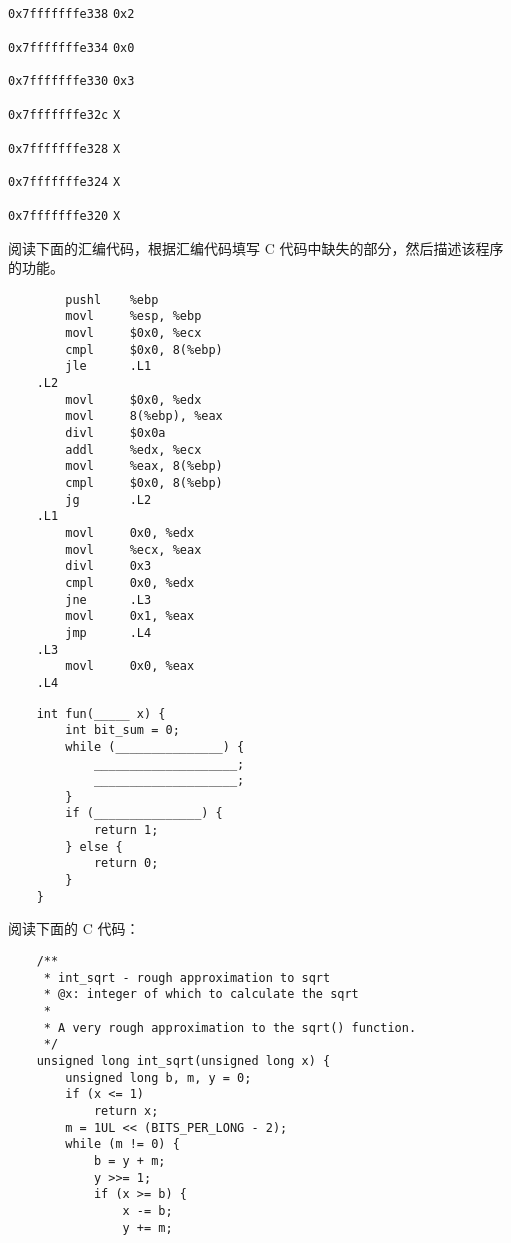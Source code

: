 \begin{problems}
\begin{compactdesc}
            \item[\texttt{0x7fffffffe338}] \verb|0x2|
            \item[\texttt{0x7fffffffe334}] \verb|0x0|
            \item[\texttt{0x7fffffffe330}] \verb|0x3|
            \item[\texttt{0x7fffffffe32c}] \verb|X|
            \item[\texttt{0x7fffffffe328}] \verb|X|
            \item[\texttt{0x7fffffffe324}] \verb|X|
            \item[\texttt{0x7fffffffe320}] \verb|X|
        \end{compactdesc}
         阅读下面的汇编代码，根据汇编代码填写 C 代码中缺失的部分，然后描述该程序的功能。
        \begin{verbatim}
        pushl    %ebp
        movl     %esp, %ebp
        movl     $0x0, %ecx
        cmpl     $0x0, 8(%ebp)
        jle      .L1
    .L2
        movl     $0x0, %edx
        movl     8(%ebp), %eax
        divl     $0x0a
        addl     %edx, %ecx
        movl     %eax, 8(%ebp)
        cmpl     $0x0, 8(%ebp)
        jg       .L2
    .L1
        movl     0x0, %edx
        movl     %ecx, %eax
        divl     0x3
        cmpl     0x0, %edx
        jne      .L3
        movl     0x1, %eax
        jmp      .L4
    .L3
        movl     0x0, %eax
    .L4 
        \end{verbatim}
        \begin{verbatim}
    int fun(_____ x) {
        int bit_sum = 0;
        while (_______________) {
            ____________________;
            ____________________;
        }
        if (_______________) {
            return 1;
        } else {
            return 0;
        }
    }
        \end{verbatim}
         阅读下面的 C 代码：
        \begin{verbatim}
    /**
     * int_sqrt - rough approximation to sqrt
     * @x: integer of which to calculate the sqrt
     *
     * A very rough approximation to the sqrt() function.
     */ 
    unsigned long int_sqrt(unsigned long x) {
        unsigned long b, m, y = 0;
        if (x <= 1) 
            return x; 
        m = 1UL << (BITS_PER_LONG - 2); 
        while (m != 0) {
            b = y + m; 
            y >>= 1; 
            if (x >= b) {
                x -= b;
                y += m; 

\end{verbatim}
\end{problems}
